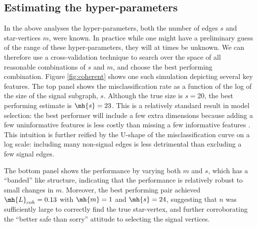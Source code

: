 \documentclass[10pt,journal,cspaper,compsoc]{IEEEtran}
\begin{document}
\subsection{Estimating the hyper-parameters} %
\label{sub:estimating_the_hyper_parameters}

In the above analyses the hyper-parameters, both the number of edges $s$ and star-vertices $m$, were known.  In practice while one might have a preliminary guess of the range of these hyper-parameters, they will at times be unknown.  We can therefore use a cross-validation technique to search over the space of all reasonable combinations of $s$ and $m$, and choose the best performing combination.  Figure \ref{fig:coherent} shows one such simulation depicting several key features.  The top panel shows the misclassification rate as a function of the log of the size of the signal subgraph, $s$.  Although the true size is $s=20$, the best performing estimate is $\mh{s}=23$. This is a relatively standard result in model selection: the best performer will include a few extra dimensions because adding a few uninformative features is less costly than missing a few informative features \cite{Jain2000}.  This intuition is further reified by the U-shape of the misclassification curve on a log scale: including many non-signal edges is less detrimental than excluding a few signal edges.

The bottom panel shows the performance by varying both $m$ and $s$, which has a ``banded'' like structure, indicating that the performance is relatively robust to small changes in $m$.  Moreover, the best performing pair achieved $\mh{L}_{coh}=0.13$ with $\mh{m}=1$ and $\mh{s}=24$, suggesting that $n$ was sufficiently large to correctly find the true star-vertex, and further corroborating the ``better safe than sorry'' attitude to selecting the signal vertices. 
\end{document}
